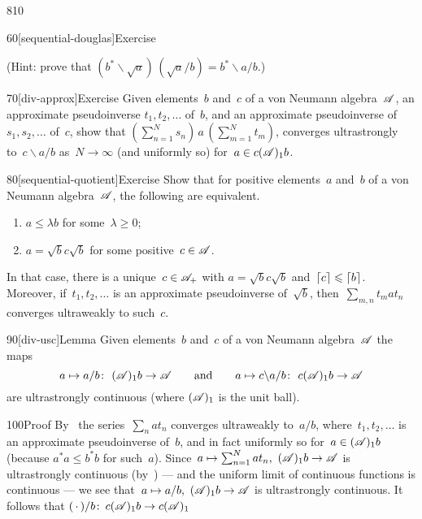 \begin{parsec}{810}
\begin{point}{60}[sequential-douglas]{Exercise}
\begin{enumerate}
(Hint: prove that $(b^*\backslash \sqrt{a})\,(\sqrt{a}/b)
= b^*\backslash a/b$.)
\end{enumerate}%
\spacingfix%
\end{point}%
\begin{point}{70}[div-approx]{Exercise}%
Given elements~$b$ and~$c$ of a von Neumann algebra~$\mathscr{A}$,
an approximate pseudoinverse $t_1,t_2,\dotsc$
of~$b$,
and an approximate pseudoinverse of~$s_1,s_2,\dotsc$
of~$c$,
show that
$(\sum_{n=1}^N s_n) \,a\, (\sum_{m=1}^Nt_m)$,
converges ultrastrongly to~$c\backslash a /b$%
as~$N\to\infty$
(and uniformly so) for~$a\in c(\mathscr{A})_1 b$.
\end{point}
\begin{point}{80}[sequential-quotient]{Exercise}%
Show that for positive elements~$a$ and~$b$ of a von Neumann
algebra~$\mathscr{A}$,
the following are equivalent.
\begin{enumerate}
\item
$a\leq \lambda b$ for some~$\lambda\geq 0$;
\item
$a=\sqrt{b}c\sqrt{b}$
for some positive~$c\in\mathscr{A}$.
\end{enumerate}
In that case, there is a unique~$c\in\mathscr{A}_+$
with $a=\sqrt{b}c\sqrt{b}$
and~$\left\lceil c\right\rceil\leqslant \left\lceil b\right\rceil$.
Moreover,
if~$t_1,t_2,\dotsc$
is an approximate pseudoinverse of~$\sqrt{b}$,
then~$\sum_{m,n} t_m a t_n$
converges ultraweakly to such~$c$.
\end{point}
\begin{point}{90}[div-usc]{Lemma}%
Given elements~$b$ and~$c$  of a von Neumann algebra~$\mathscr{A}$
the maps 
\begin{equation*}
	a\mapsto a/b\colon \  (\mathscr{A})_1b \to \mathscr{A}
\qquad\text{and}\qquad
a\mapsto c\backslash a/b\colon\  c(\mathscr{A})_1b\to \mathscr{A}
\end{equation*}
are ultrastrongly continuous
(where $(\mathscr{A})_1$ is the unit ball).
\begin{point}{100}{Proof}%
By~
the series~$\sum_n at_n$ converges ultraweakly to~$a/b$,
where~$t_1,t_2,\dotsc$
is an approximate pseudoinverse of~$b$,
and in fact uniformly so for~$a\in(\mathscr{A})_1 b$
(because $a^*a\leq b^*b$ for such~$a$).
Since~$a\mapsto \sum_{n=1}^N at_n,\ (\scrA)_1b\to\scrA$
is ultrastrongly continuous (by~)
--- and the uniform limit of continuous functions is continuous ---
we see that~$a\mapsto a/b,
\ (\mathscr{A})_1b\to\mathscr{A}$ is ultrastrongly continuous.
It follows that
$(\,\cdot\,)/b\colon\,c(\mathscr{A})_1b\to c(\mathscr{A})_1$

\end{point}
\end{point}
\end{parsec}
